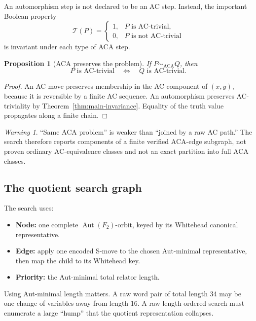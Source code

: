 \documentclass[11pt]{article}
\newtheorem{proposition}[theorem]{Proposition}
\theoremstyle{definition}
\theoremstyle{remark}
\newtheorem{warning}[theorem]{Warning}
\newcommand{\F}{F_2}
\newcommand{\Aut}{\operatorname{Aut}}
\newcommand{\ACA}{\mathrm{ACA}}
\begin{document}
An automorphism step is not declared to be an AC step.  Instead, the
important Boolean property
\[
  \mathcal T(P)=
  \begin{cases}
  1,&P\text{ is AC-trivial},\\
  0,&P\text{ is not AC-trivial}
  \end{cases}
\]
is invariant under each type of ACA step.

\begin{proposition}[ACA preserves the problem]
\label{prop:aca-preserves}
If \(P\sim_{\ACA}Q\), then
\[
  P\text{ is AC-trivial}
  \quad\Longleftrightarrow\quad
  Q\text{ is AC-trivial}.
\]
\end{proposition}

\begin{proof}
An AC move preserves membership in the AC component of \((x,y)\), because
it is reversible by a finite AC sequence.  An automorphism preserves
AC-triviality by Theorem~\ref{thm:main-invariance}.  Equality of the truth
value propagates along a finite chain.
\end{proof}

\begin{warning}
``Same ACA problem'' is weaker than ``joined by a raw AC path.''  The search
therefore reports components of a finite verified ACA-edge subgraph, not
proven ordinary AC-equivalence classes and not an exact partition into full
ACA classes.
\end{warning}

\subsection{The quotient search graph}

The search uses:
\begin{itemize}
  \item \textbf{Node:} one complete \(\Aut(\F)\)-orbit, keyed by its
  Whitehead canonical representative.
  \item \textbf{Edge:} apply one encoded S-move to the chosen Aut-minimal
  representative, then map the child to its Whitehead key.
  \item \textbf{Priority:} the Aut-minimal total relator length.
\end{itemize}

Using Aut-minimal length matters.  A raw word pair of total length 34 may be
one change of variables away from length 16.  A raw length-ordered search
must enumerate a large ``hump'' that the quotient representation collapses.
\end{document}
